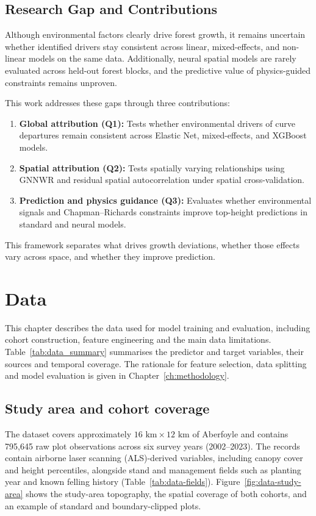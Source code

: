 \documentclass[logo,msc,ai]{infthesis}           %
\begin{document}
\section{Research Gap and Contributions}
Although environmental factors clearly drive forest growth, it remains uncertain whether identified drivers stay consistent across linear, mixed-effects, and non-linear models on the same data. Additionally, neural spatial models are rarely evaluated across held-out forest blocks, and the predictive value of physics-guided constraints remains unproven.

This work addresses these gaps through three contributions:
\begin{enumerate}
\setlength\itemsep{0pt}
\item \textbf{Global attribution (Q1):} Tests whether environmental drivers of curve departures remain consistent across Elastic Net, mixed-effects, and XGBoost models.
\item \textbf{Spatial attribution (Q2):} Tests spatially varying relationships using GNNWR and residual spatial autocorrelation under spatial cross-validation.
\item \textbf{Prediction and physics guidance (Q3):} Evaluates whether environmental signals and Chapman--Richards constraints improve top-height predictions in standard and neural models.
\end{enumerate}
This framework separates what drives growth deviations, whether those effects vary across space, and whether they improve prediction.

\chapter{Data} \label{ch:data}
This chapter describes the data used for model training and evaluation, including cohort construction, feature engineering and the main data limitations. Table~\ref{tab:data_summary} summarises the predictor and target variables, their sources and temporal coverage. The rationale for feature selection, data splitting and model evaluation is given in Chapter~\ref{ch:methodology}.

\section{Study area and cohort coverage}
The dataset covers approximately $16\text{~km} \times 12\text{~km}$ of Aberfoyle and contains 795,645 raw plot observations across six survey years (2002--2023). The records contain airborne laser scanning (ALS)-derived variables, including canopy cover and height percentiles, alongside stand and management fields such as planting year and known felling history (Table~\ref{tab:data-fields}). 
Figure~\ref{fig:data-study-area} shows the study-area topography, the spatial coverage of both cohorts, and an example of standard and boundary-clipped plots.
\end{document}
